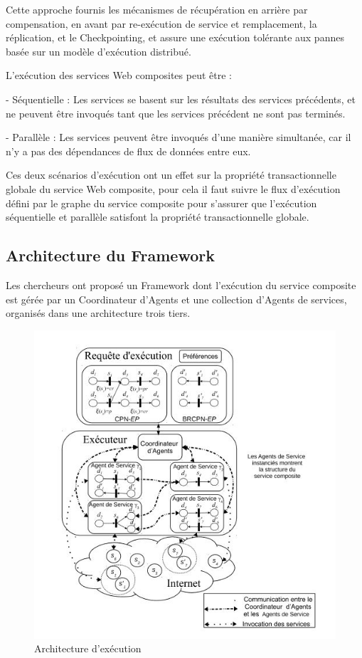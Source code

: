 Cette approche fournis les mécanismes de récupération en arrière par compensation, en avant par re-exécution de service et remplacement, la réplication, et le Checkpointing, et assure une exécution tolérante aux pannes basée sur un modèle d'exécution distribué.

L'exécution des services Web composites peut être \cite{3} : 

- Séquentielle : Les services se basent sur les résultats des services précédents, et ne peuvent être invoqués tant que les services précédent ne sont pas terminés.

- Parallèle : Les services peuvent être invoqués d'une manière simultanée, car il n'y a pas des dépendances de flux de données entre eux.

Ces deux scénarios d'exécution ont un effet sur la propriété transactionnelle globale du service Web composite, pour cela il faut suivre le flux d'exécution défini par le graphe du service composite pour s'assurer que l'exécution séquentielle et parallèle satisfont la propriété transactionnelle globale.

\subsection{Architecture du Framework}

Les chercheurs ont proposé un Framework dont l'exécution du service composite est gérée par un Coordinateur d'Agents et une collection d'Agents de services, organisés dans une architecture trois tiers.

\begin{figure}[H]
\begin{center}
\includegraphics[width=1\linewidth]{images/architectureFrmwork.jpg}
\end{center}
\caption{Architecture d'exécution \cite{1}}
\label{fig:4}
\end{figure}


